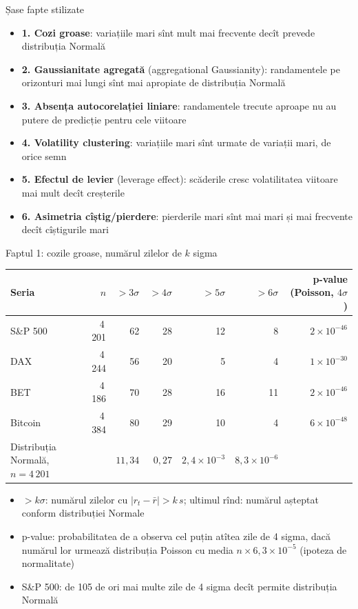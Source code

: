 \begin{frame}{Șase fapte stilizate}
\itemsize{\small}
\begin{itemize}
    \item \textbf{1. Cozi groase}: variațiile mari sînt mult mai frecvente decît prevede distribuția Normală
    \item \textbf{2. Gaussianitate agregată} (aggregational Gaussianity): randamentele pe orizonturi mai lungi sînt mai apropiate de distribuția Normală
    \item \textbf{3. Absența autocorelației liniare}: randamentele trecute aproape nu au putere de predicție pentru cele viitoare
    \item \textbf{4. Volatility clustering}: variațiile mari sînt urmate de variații mari, de orice semn
    \item \textbf{5. Efectul de levier} (leverage effect): scăderile cresc volatilitatea viitoare mai mult decît creșterile
    \item \textbf{6. Asimetria cîștig/pierdere}: pierderile mari sînt mai mari și mai frecvente decît cîștigurile mari
\end{itemize}
\end{frame}

\begin{frame}{Faptul 1: cozile groase, numărul zilelor de $k$ sigma}
\itemsize{\footnotesize}
\begin{center}
\footnotesize
\begin{tabular}{lrrrrrr}
\toprule
Seria & $n$ & $>3\sigma$ & $>4\sigma$ & $>5\sigma$ & $>6\sigma$ & p-value (Poisson, $4\sigma$) \\
\midrule
S\&P 500 & 4\,201 & 62 & 28 & 12 & 8 & ${2 \times 10^{-46}}$ \\
DAX & 4\,244 & 56 & 20 & 5 & 4 & ${1 \times 10^{-30}}$ \\
BET & 4\,186 & 70 & 28 & 16 & 11 & ${2 \times 10^{-46}}$ \\
Bitcoin & 4\,384 & 80 & 29 & 10 & 4 & ${6 \times 10^{-48}}$ \\
Distribuția Normală, $n = 4\,201$ & & $11{,}34$ & $0{,}27$ & $2{,}4 \times 10^{-3}$ & $8{,}3 \times 10^{-6}$ &  \\
\bottomrule
\end{tabular}
\end{center}
\begin{itemize}
    \item $>k\sigma$: numărul zilelor cu $|r_t - \bar r| > k\,s$; ultimul rînd: numărul așteptat conform distribuției Normale
    \item p-value: probabilitatea de a observa cel puțin atîtea zile de 4 sigma, dacă numărul lor urmează distribuția Poisson cu media $n \times 6{,}3 \times 10^{-5}$ (ipoteza de normalitate)
    \item S\&P 500: de 105 de ori mai multe zile de 4 sigma decît permite distribuția Normală
\end{itemize}
\end{frame}

